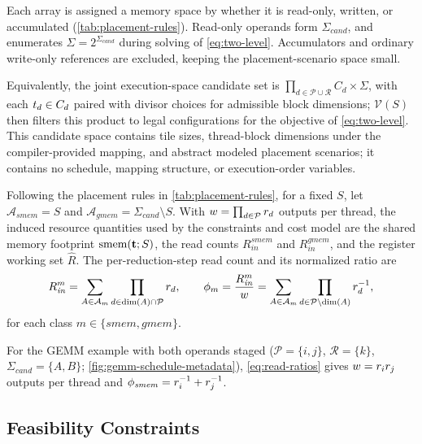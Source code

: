 Each array is assigned a memory space by whether it is read-only, written, or accumulated
(\autoref{tab:placement-rules}). Read-only operands form
\(\Sigma_{\mathit{cand}}\), and \name enumerates
\(\Sigma=2^{\Sigma_{\mathit{cand}}}\) during solving of
\autoref{eq:two-level}. Accumulators and ordinary write-only references are
excluded, keeping the placement-scenario space small.

Equivalently, the joint execution-space candidate set is \(\prod_{d\in\mathcal{P}\cup\mathcal{R}} C_d \times \Sigma\), with each \(t_d\in C_d\) paired with divisor choices for admissible block dimensions; \(\mathcal{V}(S)\) then filters this product to legal configurations for the objective of \autoref{eq:two-level}. This candidate space contains tile sizes, thread-block dimensions under the compiler-provided mapping, and abstract modeled placement scenarios; it contains no schedule, mapping structure, or execution-order variables.

Following the placement rules in \autoref{tab:placement-rules}, for a fixed \(S\), let \(\mathcal{A}_{\mathit{smem}}=S\) and \(\mathcal{A}_{\mathit{gmem}}=\Sigma_{\mathit{cand}}\setminus S\). With \(w=\prod_{d\in\mathcal{P}}r_d\) outputs per thread, the induced resource quantities used by the constraints and cost model are the shared memory footprint \(\operatorname{smem}(\mathbf{t};S)\), the read counts \(R^{\mathit{smem}}_{\mathit{in}}\) and \(R^{\mathit{gmem}}_{\mathit{in}}\), and the register working set \(\hat{R}\). The per-reduction-step read count and its normalized ratio are
\begin{equation}
R^{m}_{\mathit{in}}
=\sum_{A \in \mathcal{A}_{m}}
 \prod_{d \in \dim(A) \cap \mathcal{P}} r_d,
\qquad
\phi_{m}
=\frac{R^{m}_{\mathit{in}}}{w}
=\sum_{A \in \mathcal{A}_{m}}
 \prod_{d \in \mathcal{P} \setminus \dim(A)} r_d^{-1},
\label{eq:read-ratios}
\end{equation}
for each class \(m \in \{\mathit{smem},\mathit{gmem}\}\).

For the GEMM example with both operands staged (\(\mathcal{P}=\{i,j\}\), \(\mathcal{R}=\{k\}\), \(\Sigma_{\mathit{cand}}=\{A,B\}\); \autoref{fig:gemm-schedule-metadata}), \autoref{eq:read-ratios} gives \(w=r_ir_j\) outputs per thread and \(\phi_{\mathit{smem}}=r_i^{-1}+r_j^{-1}\).

\subsection{Feasibility Constraints}
\label{sec:constraints}
\label{sec:register-filter}

